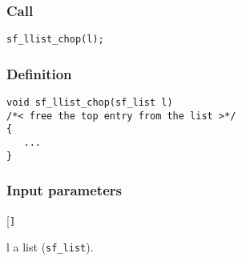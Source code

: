 \subsubsection*{Call}
\begin{verbatim}sf_llist_chop(l);\end{verbatim}

\subsubsection*{Definition}
\begin{verbatim}
void sf_llist_chop(sf_list l) 
/*< free the top entry from the list >*/
{
   ...
}
\end{verbatim}

\subsubsection*{Input parameters}
\begin{desclist}{\tt }{\quad}[\tt ]
   \setlength\itemsep{0pt}
   \item[l] a list (\texttt{sf\_list}).  
\end{desclist}





